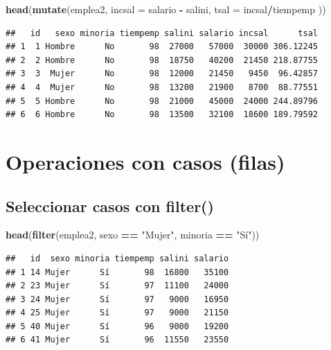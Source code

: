 \documentclass[]{book}
\newenvironment{Shaded}{\begin{snugshade}}{\end{snugshade}}
\newcommand{\KeywordTok}[1]{\textcolor[rgb]{0.13,0.29,0.53}{\textbf{#1}}}
\newcommand{\DataTypeTok}[1]{\textcolor[rgb]{0.13,0.29,0.53}{#1}}
\newcommand{\StringTok}[1]{\textcolor[rgb]{0.31,0.60,0.02}{#1}}
\newcommand{\OperatorTok}[1]{\textcolor[rgb]{0.81,0.36,0.00}{\textbf{#1}}}
\newcommand{\NormalTok}[1]{#1}
\begin{document}
\begin{Shaded}
\begin{Highlighting}[]
\KeywordTok{head}\NormalTok{(}\KeywordTok{mutate}\NormalTok{(emplea2, }\DataTypeTok{incsal =}\NormalTok{ salario }\OperatorTok{-}\StringTok{ }\NormalTok{salini, }\DataTypeTok{tsal =}\NormalTok{ incsal}\OperatorTok{/}\NormalTok{tiempemp ))}
\end{Highlighting}
\end{Shaded}

\begin{verbatim}
##   id   sexo minoria tiempemp salini salario incsal      tsal
## 1  1 Hombre      No       98  27000   57000  30000 306.12245
## 2  2 Hombre      No       98  18750   40200  21450 218.87755
## 3  3  Mujer      No       98  12000   21450   9450  96.42857
## 4  4  Mujer      No       98  13200   21900   8700  88.77551
## 5  5 Hombre      No       98  21000   45000  24000 244.89796
## 6  6 Hombre      No       98  13500   32100  18600 189.79592
\end{verbatim}

\section{Operaciones con casos
(filas)}\label{operaciones-con-casos-filas}

\subsection{\texorpdfstring{Seleccionar casos con
\textbf{filter()}}{Seleccionar casos con filter()}}\label{seleccionar-casos-con-filter}

\begin{Shaded}
\begin{Highlighting}[]
\KeywordTok{head}\NormalTok{(}\KeywordTok{filter}\NormalTok{(emplea2, sexo }\OperatorTok{==}\StringTok{ "Mujer"}\NormalTok{, minoria }\OperatorTok{==}\StringTok{ "Sí"}\NormalTok{))}
\end{Highlighting}
\end{Shaded}

\begin{verbatim}
##   id  sexo minoria tiempemp salini salario
## 1 14 Mujer      Sí       98  16800   35100
## 2 23 Mujer      Sí       97  11100   24000
## 3 24 Mujer      Sí       97   9000   16950
## 4 25 Mujer      Sí       97   9000   21150
## 5 40 Mujer      Sí       96   9000   19200
## 6 41 Mujer      Sí       96  11550   23550
\end{verbatim}
\end{document}
